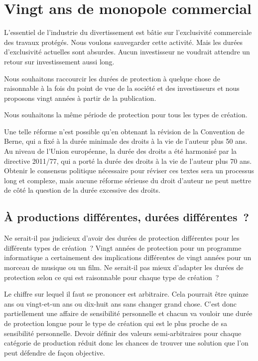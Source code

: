 \chapter{Vingt ans de monopole commercial}\label{dur}

L’essentiel de l’industrie du divertissement est bâtie sur l’exclusivité commerciale des
travaux protégés. Nous voulons sauvegarder cette activité. Mais les durées d’exclusivité actuelles
sont absurdes. Aucun investisseur ne voudrait attendre un retour sur investissement aussi long.

\begin{mesure}
 Nous souhaitons raccourcir les durées de protection à quelque chose de raisonnable à la fois du
point de vue de la société et des investisseurs et nous proposons vingt années à partir de la
publication.

Nous souhaitons la même période de protection pour tous les types de création.
\end{mesure}

Une telle réforme n'est possible qu'en obtenant la révision de la Convention de Berne, qui a fixé à la durée minimale des droits à la vie de l'auteur plus 50 ans. Au niveau de l'Union européenne, la durée des droits a été harmonisé par la directive 2011/77, qui a porté la durée des droits à la vie de l'auteur plus 70 ans. Obtenir le consensus politique nécessaire pour réviser ces textes sera un processus long et complexe, mais aucune réforme sérieuse du droit d'auteur ne peut mettre de côté la question de la durée excessive des droits. 

\section{À productions différentes, durées différentes~?}

Ne serait-il pas judicieux d’avoir des durées de protection différentes pour les différents types de
création~? Vingt années de protection pour un programme informatique a certainement des
implications différentes de vingt années pour un morceau de musique ou un film. Ne serait-il pas mieux
d’adapter les durées de protection selon ce qui est raisonnable pour chaque type de création~?

Le chiffre sur lequel il faut se prononcer est arbitraire. Cela pourrait être quinze ans ou vingt-et-un ans ou dix-huit ans sans changer grand chose. C'est donc partiellement une affaire de sensibilité personnelle et chacun va vouloir une durée de protection longue pour le type de création qui est le plus proche de sa sensibilité personnelle. Devoir définir des valeurs semi-arbitraires pour
chaque catégorie de production réduit donc les chances de trouver une
solution que l’on peut défendre de façon objective.

